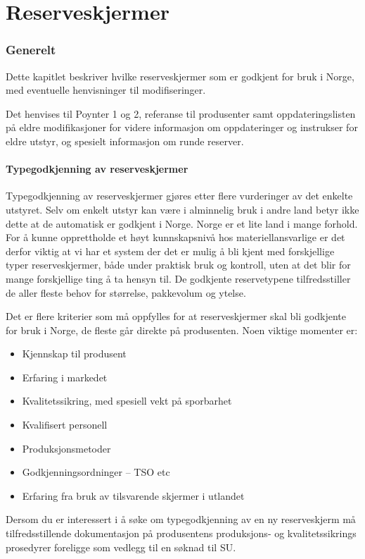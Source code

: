 \part{Reserveskjermer}

\section{Generelt}
Dette kapitlet beskriver hvilke reserveskjermer som er godkjent for bruk i Norge, med eventuelle henvisninger til modifiseringer.

Det henvises til Poynter 1 og 2, referanse til produsenter samt oppdateringslisten på eldre modifikasjoner for videre informasjon om oppdateringer og instrukser for eldre utstyr, og spesielt informasjon om runde reserver.

\subsection{Typegodkjenning av reserveskjermer}
Typegodkjenning av reserveskjermer gjøres etter flere vurderinger av det enkelte utstyret. Selv om enkelt utstyr kan være i alminnelig bruk i andre land betyr ikke dette at de automatisk er godkjent i Norge. Norge er et lite land i mange forhold. For å kunne opprettholde et høyt kunnskapsnivå hos materiellansvarlige er det derfor viktig at vi har et system der det er mulig å bli kjent med forskjellige typer reserveskjermer, både under praktisk bruk og kontroll, uten at det blir for mange forskjellige ting å ta hensyn til. De godkjente reservetypene tilfredsstiller de aller fleste behov for størrelse, pakkevolum og ytelse.

Det er flere kriterier som må oppfylles for at reserveskjermer skal bli godkjente for bruk i Norge, de fleste går direkte på produsenten. Noen viktige momenter er:
\begin{itemize}
	\item Kjennskap til produsent
	\item Erfaring i markedet
	\item Kvalitetssikring, med spesiell vekt på sporbarhet
	\item Kvalifisert personell
	\item Produksjonsmetoder
	\item Godkjenningsordninger – TSO etc
	\item Erfaring fra bruk av tilsvarende skjermer i utlandet
\end{itemize}

Dersom du er interessert i å søke om typegodkjenning av en ny reserveskjerm må tilfredsstillende dokumentasjon på produsentens produksjons- og kvalitetssikrings prosedyrer foreligge som vedlegg til en søknad til SU.

